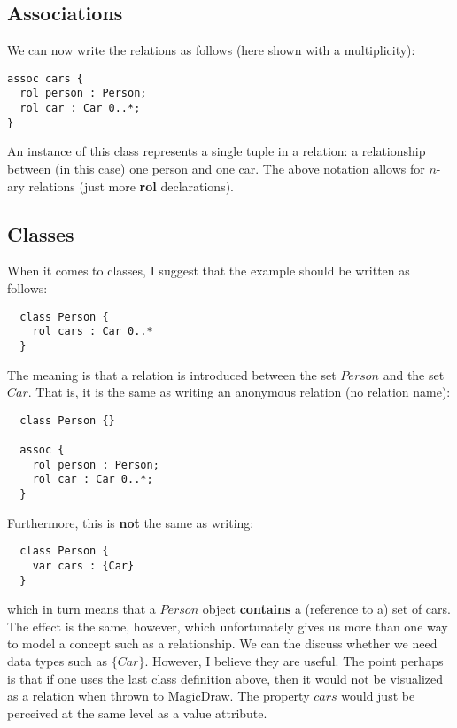 \documentclass{llncs}
\begin{document}
\subsection{Associations}

We can now write the relations as follows (here shown with a multiplicity):

\sk
\begin{lstlisting}
assoc cars {
  rol person : Person;
  rol car : Car 0..*;
}
\end{lstlisting}

\noindent
An instance of this class represents a single tuple in a relation: a relationship between (in this case) one person and one car. The above notation allows for $n$-ary relations (just more {\bf rol} declarations).

\subsection{Classes}

When it comes to classes, I suggest that the example
should be written as follows:

\sk
\begin{lstlisting}
  class Person {
    rol cars : Car 0..*
  }
\end{lstlisting}

\noindent The meaning is that a relation is introduced between the set $Person$ and the set $Car$. That is, it is
the same as writing an anonymous relation (no relation name):

\sk
\begin{lstlisting}
  class Person {}
  
  assoc {
    rol person : Person;
    rol car : Car 0..*;
  }
\end{lstlisting}

\noindent
Furthermore, this is {\bf not} the same as writing:

\sk
\begin{lstlisting}
  class Person {
    var cars : {Car} 
  }
\end{lstlisting}

\noindent which in turn means that a $Person$ object {\bf contains} a (reference to a) set of cars. The effect is
the same, however, which unfortunately gives us more than one way to model a concept such as a relationship.
We can the discuss whether we need data types such as $\{Car\}$. However, I believe they are useful. The point perhaps is that if one uses the last class definition above, then it would not be visualized as a relation when
thrown to MagicDraw. The property $cars$ would just be perceived at the same level as a value attribute.
\end{document}
